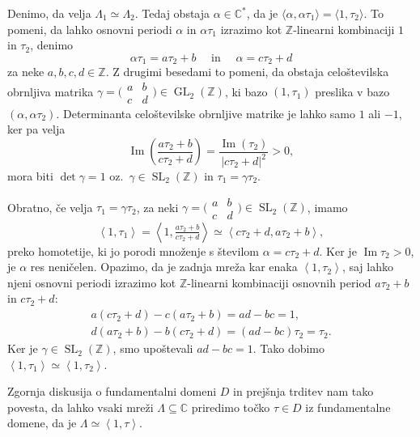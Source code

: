 \documentclass[mat1]{fmfdelo}
\numberwithin{equation}{section}
\newcommand{\Z}{\mathbb Z}
\newcommand{\C}{\mathbb C}
\newcommand{\CM}{\mathbb C ^*}
\newcommand{\SL}{\operatorname{SL}_2(\Z)}
\newcommand{\abcd}{\big(\begin{smallmatrix} a & b\\c & d \end{smallmatrix}\big)}
\newcommand{\htp}{\simeq}
\newcommand{\abs}[1]{\left\lvert #1 \right\rvert}
\newcommand{\lattice}[2]{\left\langle #1, #2 \right\rangle}
\renewcommand\Im{\operatorname{Im}}%
\newcommand{\oz}{oz.\ }
\DeclareMathOperator{\GL}{GL}
\theoremstyle{definition}
\begin{document}
\begin{dokaz}
    Denimo, da velja $\Lambda_1 \htp \Lambda_2$. Tedaj obstaja $\alpha \in \CM$, da je $\langle \alpha, \alpha\tau_1 \rangle = \langle 1, \tau_2 \rangle$. To pomeni, da lahko osnovni periodi $\alpha$ in $\alpha\tau_1$ izrazimo kot $\Z$-linearni kombinaciji $1$ in $\tau_2$, denimo 
    \[
        \alpha\tau_1 = a\tau_2 + b \quad \text{ in } \quad \alpha = c\tau_2 + d  
    \]
    za neke $a, b, c, d \in \Z$. Z drugimi besedami to pomeni, da obstaja celoštevilska obrnljiva matrika $\gamma = \abcd \in \GL_2(\Z)$, ki bazo $(1,\tau_1)$ preslika v bazo $(\alpha, \alpha\tau_2)$. Determinanta celoštevilske obrnljive matrike je lahko samo $1$ ali $-1$, ker pa velja 
    \[
        \Im\left(\frac{a\tau_2 + b}{c\tau_2 + d}\right) = 
        \frac{\Im(\tau_2)}{\abs{c\tau_2 + d}^2}> 0,
    \]
    mora biti $\det\gamma = 1$ \oz $\gamma \in \SL$ in $\tau_1 = \gamma\tau_2$.
    

    Obratno, če velja $\tau_1 = \gamma\tau_2$, za neki $\gamma = \abcd \in \SL$, imamo
    \[
        \lattice{1}{\tau_1} = 
        \lattice{1}{\tfrac{a\tau_2 + b}{c\tau_2 + d}} \htp
        \lattice{c\tau_2 + d}{a\tau_2 + b},
    \]
    preko homotetije, ki jo porodi množenje s številom $\alpha = c\tau_2 + d$. Ker je $\Im\tau_2 > 0$, je $\alpha$ res neničelen. Opazimo, da je zadnja mreža kar enaka $\lattice{1}{\tau_2}$, saj lahko njeni osnovni periodi izrazimo kot $\Z$-linearni kombinaciji osnovnih period $a\tau_2 + b$ in $c\tau_2 + d$:
    \begin{gather*}
        a(c\tau_2 + d) - c(a\tau_2 + b) = ad - bc = 1, \\
        d(a\tau_2 + b) - b(c\tau_2 + d) = (ad - bc)\tau_2 = \tau_2.
    \end{gather*}
    Ker je $\gamma \in \SL$, smo upoštevali $ad - bc = 1$. Tako dobimo $\lattice{1}{\tau_1} \htp \lattice{1}{\tau_2}$.
\end{dokaz}

Zgornja diskusija o fundamentalni domeni $D$ in prejšnja trditev nam tako povesta, da lahko vsaki mreži $\Lambda \subseteq \C$ priredimo točko $\tau \in D$ iz fundamentalne domene, da je $\Lambda \htp \lattice{1}{\tau}$.
\end{document}
